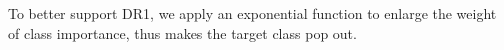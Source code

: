 %
To better support DR1, we apply an exponential function to enlarge the weight of class importance, thus makes the target class pop out.
%
%
%

